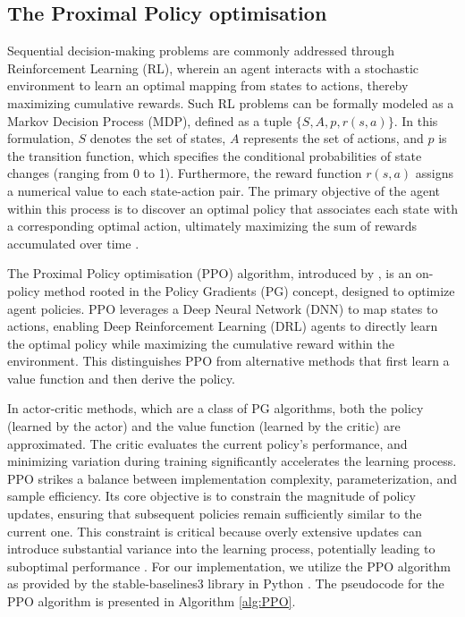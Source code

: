 \documentclass{article}
\begin{document}
\subsection{The Proximal Policy optimisation} 
\label{subsec:PPO}
Sequential decision-making problems are commonly addressed through Reinforcement Learning (RL), wherein an agent interacts with a stochastic environment to learn an optimal mapping from states to actions, thereby maximizing cumulative rewards. Such RL problems can be formally modeled as a Markov Decision Process (MDP), defined as a tuple $\{S, A, p, r(s, a)\}$. In this formulation, $S$ denotes the set of states, $A$ represents the set of actions, and $p$ is the transition function, which specifies the conditional probabilities of state changes (ranging from 0 to 1). Furthermore, the reward function $r(s, a)$ assigns a numerical value to each state-action pair. The primary objective of the agent within this process is to discover an optimal policy that associates each state with a corresponding optimal action, ultimately maximizing the sum of rewards accumulated over time \citep{alves2020deep}.

The Proximal Policy optimisation (PPO) algorithm, introduced by \cite{schulman2017proximal}, is an on-policy method rooted in the Policy Gradients (PG) concept, designed to optimize agent policies. PPO leverages a Deep Neural Network (DNN) to map states to actions, enabling Deep Reinforcement Learning (DRL) agents to directly learn the optimal policy while maximizing the cumulative reward within the environment. This distinguishes PPO from alternative methods that first learn a value function and then derive the policy.

In actor-critic methods, which are a class of PG algorithms, both the policy (learned by the actor) and the value function (learned by the critic) are approximated. The critic evaluates the current policy's performance, and minimizing variation during training significantly accelerates the learning process. PPO strikes a balance between implementation complexity, parameterization, and sample efficiency. Its core objective is to constrain the magnitude of policy updates, ensuring that subsequent policies remain sufficiently similar to the current one. This constraint is critical because overly extensive updates can introduce substantial variance into the learning process, potentially leading to suboptimal performance \citep{alves2020deep}. For our implementation, we utilize the PPO algorithm as provided by the stable-baselines3 library in Python \citep{stable-baselines3}. The pseudocode for the PPO algorithm is presented in Algorithm \ref{alg:PPO}.
\end{document}
